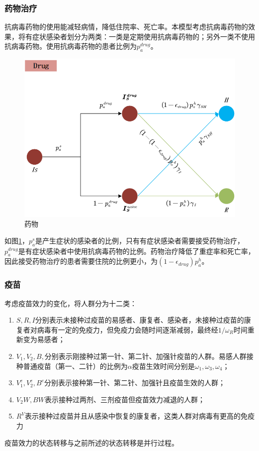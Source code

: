 \documentclass[bwprint]{gmcmthesis}
\numberwithin{figure}{section}
\begin{document}
\subsubsection{药物治疗}
抗病毒药物的使用能减轻病情，降低住院率、死亡率。本模型考虑抗病毒药物的效果，将有症状感染者划分为两类：一类是定期使用抗病毒药物的；另外一类不使用抗病毒药物。使用抗病毒药物的患者比例为$p_a^{drug}$。
\begin{figure}[!h]
\centering
\includegraphics[width=.75\textwidth]{Drug.png}
\caption{药物}
\label{drug}
\end{figure}
如图\ref{drug}，$p_a^s$是产生症状的感染者的比例，只有有症状感染者需要接受药物治疗，$p_a^{drug}$是有症状感染者中使用抗病毒药物的比例。药物治疗降低了重症率和死亡率，因此接受药物治疗的患者需要住院的比例更小，为$(1-\epsilon_{drug})p_a^h$。
\subsubsection{疫苗}
\par 考虑疫苗效力的变化，将人群分为十二类：
\begin{enumerate}
\item $S,R,I$分别表示未接种过疫苗的易感者、康复者、感染者，未接种过疫苗的康复者对病毒有一定的免疫力，但免疫力会随时间逐渐减弱，最终经$1/\omega_R$时间重新变为易感者；
\item $V_1,V_2,B,$分别表示刚接种过第一针、第二针、加强针疫苗的人群。易感人群接种普通疫苗（第一、二针）的比例为$\alpha$疫苗生效时间分别是$\omega_1,\omega_3,\omega_4$；
\item $V_1^e,V_2^e,B^e$分别表示接种第一针、第二针、加强针且疫苗生效的人群；
\item $V_2W,BW$表示接种过两剂、三剂疫苗但疫苗效力减退的人群；
\item $R^V$表示接种过疫苗并且从感染中恢复的康复者，这类人群对病毒有更高的免疫力
\end{enumerate}
\par 疫苗效力的状态转移与之前所述的状态转移是并行过程。
\end{document}
